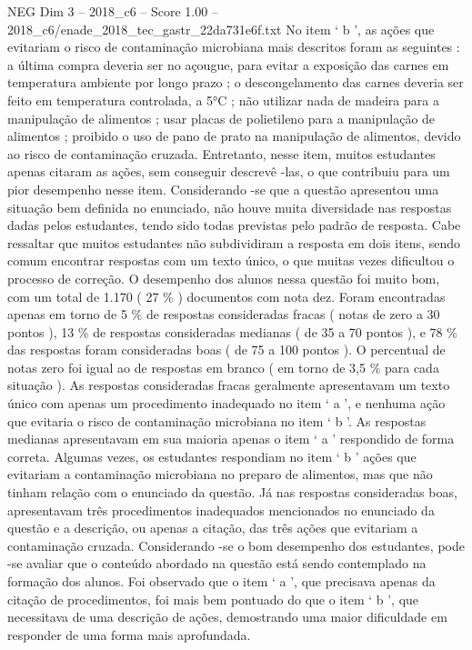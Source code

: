 \begin{textsample}{NEG Dim 3 – 2018\_c6 – Score 1.00 – 2018\_c6/enade\_2018\_tec\_gastr\_22da731e6f.txt}
No item ‘ b ’, as ações que evitariam o risco de contaminação microbiana mais descritos foram as seguintes : a última compra deveria ser no açougue, para evitar a exposição das carnes em temperatura ambiente por longo prazo ; o descongelamento das carnes deveria ser feito em temperatura controlada, a 5{\EmojiFont °}C ; não utilizar nada de madeira para a manipulação de alimentos ; usar placas de polietileno para a manipulação de alimentos ; proibido o uso de pano de prato na manipulação de alimentos, devido ao risco de contaminação cruzada.
Entretanto, nesse item, muitos estudantes apenas citaram as ações, sem conseguir descrevê -las, o que contribuiu para um pior desempenho nesse item.
Considerando -se que a questão apresentou uma situação bem definida no enunciado, não houve muita diversidade nas respostas dadas pelos estudantes, tendo sido todas previstas pelo padrão de resposta.
Cabe ressaltar que muitos estudantes não subdividiram a resposta em dois itens, sendo comum encontrar respostas com um texto único, o que muitas vezes dificultou o processo de correção.
O desempenho dos alunos nessa questão foi muito bom, com um total de 1.170 ( 27 \% ) documentos com nota dez.
Foram encontradas apenas em torno de 5 \% de respostas consideradas fracas ( notas de zero a 30 pontos ), 13 \% de respostas consideradas medianas ( de 35 a 70 pontos ), e 78 \% das respostas foram consideradas boas ( de 75 a 100 pontos ).
O percentual de notas zero foi igual ao de respostas em branco ( em torno de 3,5 \% para cada situação ).
As respostas consideradas fracas geralmente apresentavam um texto único com apenas um procedimento inadequado no item ‘ a ’, e nenhuma ação que evitaria o risco de contaminação microbiana no item ‘ b ’.
As respostas medianas apresentavam em sua maioria apenas o item ‘ a ’ respondido de forma correta.
Algumas vezes, os estudantes respondiam no item ‘ b ’ ações que evitariam a contaminação microbiana no preparo de alimentos, mas que não tinham relação com o enunciado da questão.
Já nas respostas consideradas boas, apresentavam três procedimentos inadequados mencionados no enunciado da questão e a descrição, ou apenas a citação, das três ações que evitariam a contaminação cruzada.
Considerando -se o bom desempenho dos estudantes, pode -se avaliar que o conteúdo abordado na questão está sendo contemplado na formação dos alunos.
Foi observado que o item ‘ a ’, que precisava apenas da citação de procedimentos, foi mais bem pontuado do que o item ‘ b ’, que necessitava de uma descrição de ações, demostrando uma maior dificuldade em responder de uma forma mais aprofundada.

\end{textsample}
